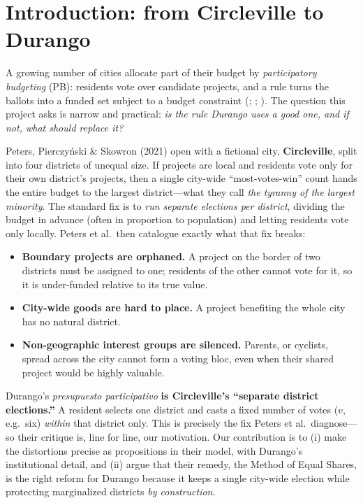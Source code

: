 \documentclass[11pt,letterpaper]{article}
\theoremstyle{definition}
\theoremstyle{plain}
\theoremstyle{remark}
\newcommand{\votes}{v}             %
\begin{document}
\section{Introduction: from Circleville to Durango}
\label{sec:intro}

A growing number of cities allocate part of their budget by \emph{participatory budgeting} (PB):
residents vote over candidate projects, and a rule turns the ballots into a funded set subject to
a budget constraint (\citealp{cabannes2004}; \citealp{wampler2021}; \citealp{azizshah2020}). The
question this project asks is narrow and practical: \emph{is the rule Durango uses a good one, and
if not, what should replace it?}

Peters, Pierczy\'nski \& Skowron (2021) open with a fictional city, \textbf{Circleville}, split into
four districts of unequal size. If projects are local and residents vote only for their own
district's projects, then a single city-wide ``most-votes-win'' count hands the entire budget to
the largest district---what they call \emph{the tyranny of the largest minority}. The standard fix
is to \emph{run separate elections per district}, dividing the budget in advance (often in
proportion to population) and letting residents vote only locally. Peters et al.\ then catalogue
exactly what that fix breaks:
\begin{itemize}[leftmargin=1.4em,itemsep=2pt,topsep=2pt]
  \item \textbf{Boundary projects are orphaned.} A project on the border of two districts must be
  assigned to one; residents of the other cannot vote for it, so it is under-funded relative to its
  true value.
  \item \textbf{City-wide goods are hard to place.} A project benefiting the whole city has no
  natural district.
  \item \textbf{Non-geographic interest groups are silenced.} Parents, or cyclists, spread across
  the city cannot form a voting bloc, even when their shared project would be highly valuable.
\end{itemize}

\begin{connection}
Durango's \emph{presupuesto participativo} \textbf{is Circleville's ``separate district
elections.''} A resident selects one district and casts a fixed number of votes
($\votes$, e.g.\ six) \emph{within} that district only. This is precisely the fix Peters et al.\
diagnose---so their critique is, line for line, our motivation. Our contribution is to (i) make the
distortions precise as propositions in their model, with Durango's institutional detail, and (ii)
argue that their remedy, the Method of Equal Shares, is the right reform for Durango because it
keeps a single city-wide election while protecting marginalized districts \emph{by construction}.
\end{connection}
\end{document}
